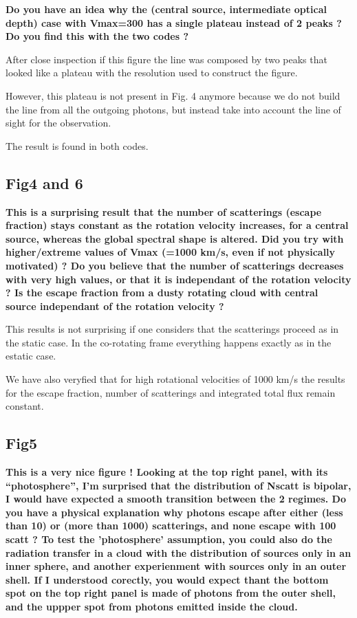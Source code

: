 \documentclass[12pt]{article}
\begin{document}
{\bf Do you have an idea why the (central source, intermediate optical
  depth) case with Vmax=300 has a single plateau instead of 2 peaks ?
  Do you find this with the two codes ?} 

After close inspection if this figure the line was composed by two 
peaks that looked like a plateau with the resolution used to
construct the figure. 

However, this plateau is not present in Fig. 4 anymore because we do
not build the line from all the outgoing photons, but instead take
into account the line of sight for the observation.

The result is found in both codes.


\subsection*{Fig4 and 6}

{\bf This is a surprising result that the number of scatterings
  (escape fraction) stays constant as the rotation velocity increases,
  for a central source, whereas the global spectral shape is
  altered. Did you try with higher/extreme values of Vmax (=1000 km/s,
  even if not physically motivated) ? Do you believe that the number
  of scatterings decreases with very high values, or that it is
  independant of the rotation velocity ? Is the escape fraction from a
  dusty rotating cloud with central source independant of the rotation
  velocity ?} 

This results is not surprising if one considers that the scatterings
proceed as in the static case. In the co-rotating frame everything
happens exactly as in the estatic case.

We have also veryfied that for high rotational velocities of 1000 km/s
the results for the escape fraction, number of scatterings and integrated total
flux remain constant.


\subsection*{Fig5}

{\bf This is a very nice figure ! Looking at the top right panel, with
  its “photosphere”, I’m surprised that the distribution of Nscatt is
  bipolar, I would have expected a smooth transition between the 2
  regimes. Do you have a physical explanation why photons escape after
  either (less than 10) or (more than 1000) scatterings, and none
  escape with 100 scatt ? To test the ’photosphere’ assumption, you
  could also do the radiation transfer in a cloud with the
  distribution of sources only in an inner sphere, and another
  experienment with sources only in an outer shell. If I understood
  corectly, you would expect thant the bottom spot on the top right
  panel is made of photons from the outer shell, and the uppper spot
  from photons emitted inside the cloud.} 
\end{document}
